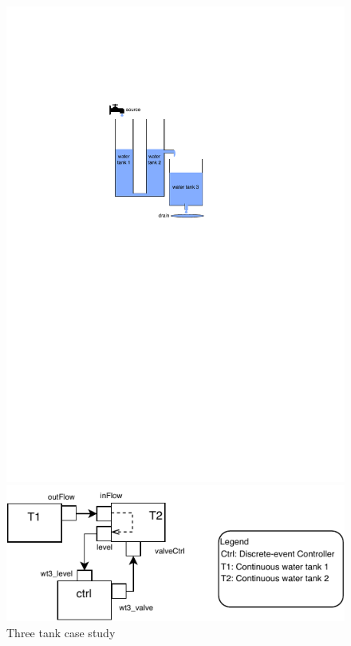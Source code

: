 \documentclass[runningheads]{llncs}
\begin{document}
\begin{figure}[H]
    \begin{minipage}{0.40\textwidth}
    \centering
        \centering
    \includegraphics[width=1\textwidth]{images/ttwt_overview.pdf}
    \end{minipage}
    \begin{minipage}{0.60\textwidth}
        \centering
    \includegraphics[width=1\textwidth]{images/threetank_FMU.pdf}
    \end{minipage}
    \caption{Three tank case study}
    \label{fig:watertank}
\end{figure}
\end{document}
